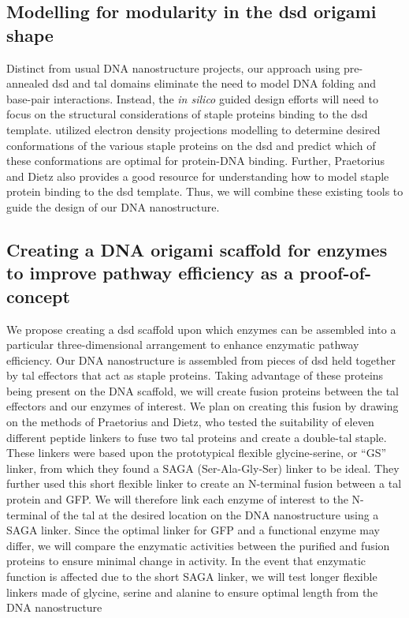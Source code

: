 \documentclass[a4paper]{article}
\begin{document}
\subsection*{Modelling for modularity in the \ac{dsd} origami shape}
Distinct from usual DNA nanostructure projects, our approach using pre-annealed \ac{dsd} and \ac{tal} domains eliminate the need to model DNA folding and base-pair interactions.
Instead, the \textit{in silico} guided design efforts will need to focus on the structural considerations of staple proteins binding to the \ac{dsd} template.
\cite{meth2} utilized electron density projections modelling to determine desired conformations of the various staple proteins on the \ac{dsd} and predict which of these conformations are optimal for protein-DNA binding.
Further, Praetorius and Dietz also provides a good resource for understanding how to model staple protein binding to the \ac{dsd} template\cite{meth2}.
Thus, we will combine these existing tools to guide the design of our DNA nanostructure.
\subsection*{Creating a DNA origami scaffold for enzymes to improve pathway efficiency as a proof-of-concept}
We propose creating a \ac{dsd} scaffold upon which enzymes can be assembled into a particular three-dimensional arrangement to enhance enzymatic pathway efficiency.
Our DNA nanostructure is assembled from pieces of \ac{dsd} held together by \ac{tal} effectors that act as staple proteins.
Taking advantage of these proteins being present on the DNA scaffold, we will create fusion proteins between the \ac{tal} effectors and our enzymes of interest.
We plan on creating this fusion by drawing on the methods of Praetorius and Dietz, who tested the suitability of eleven different peptide linkers to fuse two \ac{tal} proteins and create a double-\ac{tal} staple\cite{meth2}.
These linkers were based upon the prototypical flexible glycine-serine, or “GS” linker, from which they found a SAGA (Ser-Ala-Gly-Ser) linker to be ideal.
They further used this short flexible linker to create an N-terminal fusion between a \ac{tal} protein and GFP.
We will therefore link each enzyme of interest to the N-terminal of the \ac{tal} at the desired location on the DNA nanostructure using a SAGA linker.
Since the optimal linker for GFP and a functional enzyme may differ, we will compare the enzymatic activities between the purified and fusion proteins to ensure minimal change in activity.
In the event that enzymatic function is affected due to the short SAGA linker, we will test longer flexible linkers made of glycine, serine and alanine to ensure optimal length from the DNA nanostructure\cite{meth4}
\end{document}
